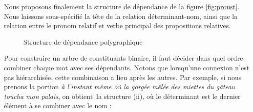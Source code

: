 {    Nous proposons finalement la structure de dépendance de la figure \ref{fig:proust}. Nous laissons sous-spécifié la tête de la relation déterminant-nom, ainsi que la relation entre le pronom relatif et verbe principal des propositions relatives.
    
    \begin{figure}[H]
  \caption{Structure de dépendance polygraphique\label{fig:proust }}
    \end{figure}
    
    Pour construire un arbre de constituants binaire, il faut décider dans quel ordre combiner chaque mot avec ses dépendants. Notons que lorsqu’une connexion n’est pas hiérarchisée, cette combinaison a lieu après les autres. Par exemple, si nous prenons la portion \textit{à l’instant même où la gorgée mêlée des miettes du gâteau toucha mon palais}, on obtient~la structure (ii), où le déterminant est le dernier élément à se combiner avec le nom :
    
}
